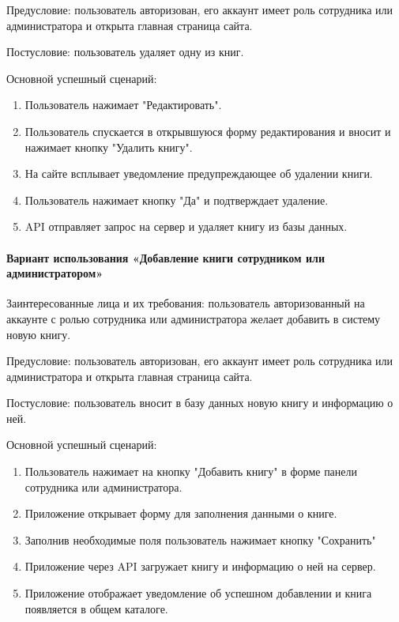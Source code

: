 Предусловие: пользователь авторизован, его аккаунт имеет роль сотрудника или администратора и открыта главная страница сайта.

Постусловие: пользователь удаляет одну из книг.

Основной успешный сценарий:

\begin{enumerate}
	\item Пользователь нажимает "Редактировать".
	\item Пользователь спускается в открывшуюся форму редактирования и вносит и нажимает кнопку "Удалить книгу".
	\item На сайте всплывает уведомление предупреждающее об удалении книги.
	\item Пользователь нажимает кнопку "Да" и подтверждает удаление.
	\item API отправляет запрос на сервер и удаляет книгу из базы данных.
\end{enumerate}


\paragraph{Вариант использования «Добавление книги сотрудником или администратором»}

Заинтересованные лица и их требования: пользователь авторизованный на аккаунте с ролью сотрудника или администратора желает добавить в систему новую книгу.

Предусловие: пользователь авторизован, его аккаунт имеет роль сотрудника или администратора и открыта главная страница сайта.

Постусловие: пользователь вносит в базу данных новую книгу и информацию о ней.

Основной успешный сценарий:

\begin{enumerate}
	\item Пользователь нажимает на кнопку "Добавить книгу" в форме панели сотрудника или администратора.
	\item Приложение открывает форму для заполнения данными о книге.
	\item Заполнив необходимые поля пользователь нажимает кнопку "Сохранить"
	\item Приложение через API загружает книгу и информацию о ней на сервер.
	\item Приложение отображает уведомление об успешном добавлении и книга появляется в общем каталоге.
\end{enumerate}

